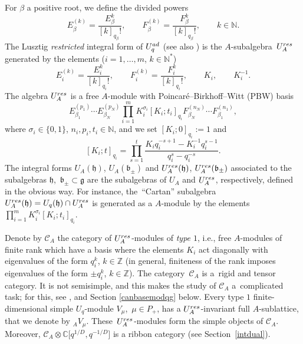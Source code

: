 \documentclass[11pt]{article}
\numberwithin{equation}{section}
\numberwithin{equation}{section}
\theoremstyle{definition}
\newcommand{\mc}{\mathbb{C}}
\newcommand{\mz}{\mathbb{Z}}
\newcommand{\mn}{\mathbb{N}}
\begin{document}
For $\beta$ a positive root, we define the divided powers
\[E_{\beta}^{(k)} = \frac{E_\beta^k}{[k]_{q_\beta}!} , \qquad F_{\beta}^{(k)} = \frac{F_\beta^k}{[k]_{q_\beta}!}, \qquad k\in \mn.\]
The Lusztig {\it restricted} integral form of $U_q^{\rm ad}$ \cite{Lusztig2,Lusztig} (see also \cite[Chapter 9.3]{CP}) is the $A$-sub\-algebra~$U_A^{\rm res}$ generated by the elements ($i=1,\dots,m$, $k\in \mn^*$)
\[E_i^{(k)}= \frac{E_i^k}{[k]_{q_i}!},\qquad F_i^{(k)}= \frac{F_i^k}{[k]_{q_i}!} ,\qquad K_i ,\qquad K_i^{-1}.\]
The algebra $U_A^{\rm res}$ is a free $A$-module with Poincar\'e--Birkhoff--Witt (PBW) basis
\[%
E_{\beta_1}^{(p_1)}\cdots E_{\beta_N}^{(p_N)}\prod_{i=1}^m K_i^{\sigma_i}[ K_i; t_i]_{q_i} F_{\beta_N}^{(n_N)}\cdots F_{\beta_1}^{(n_1)},
\]
where $\sigma_i\in \{0,1\}$, $n_i,p_i, t_i\in \mn$, and we set $[ K_i; 0]_{q_i}:=1$ and
\[[ K_i; t ]_{q_i}= \prod_{s=1}^t \frac{K_iq_i^{-s+1}-K_i^{-1}q_i^{s-1}}{q_i^s-q_i^{-s}}.\]
The integral forms $U_A(\mathfrak{h})$, $U_A(\mathfrak{b}_\pm)$ and $U_A^{\rm res}(\mathfrak{h})$, $U_A^{\rm res}(\mathfrak{b}_\pm)$ associated to the subalgebras $\mathfrak{h}$,~$\mathfrak{b}_\pm \subset \mathfrak{g}$ are the subalgebras of $U_A$ and $U_A^{\rm res}$, respectively, defined in the obvious way. For instance, the~``Cartan'' subalgebra $U_A^{\rm res}(\mathfrak{h}) = U_q(\mathfrak{h})\cap U_A^{\rm res}$ is generated as a $A$-module by the elements $\prod_{i=1}^m K_i^{\sigma_i}[ K_i; t_i]_{q_i}$.

Denote by $\mathcal{C}_A$ the category of $U_A^{\rm res}$-modules of {\it type $1$}, i.e., free $A$-modules of finite rank which have a basis where the elements $K_i$ act diagonally with eigenvalues of the form $q_i^k$, $k\in \mz$ (in general, finiteness of the rank imposes eigenvalues of the form $\pm q_i^k$, $k\in \mz$). The category~$\mathcal{C}_A$ is a~rigid and tensor category. It is not semisimple, and this makes the study of $\mathcal{C}_A$ a~complicated task; for this, see \cite{BR}, and Section \ref{canbasemodqg} below. Every type $1$ finite-dimensional simple $U_q$-module $V_\mu$,~$\mu \in P_+$, has a $U_A^{\rm res}$-invariant full $A$-sublattice, that we denote by ${}_AV_\mu$. These~$U_A^{\rm res}$-modules form the simple objects of $\mathcal{C}_A$. Moreover, $\mathcal{C}_A \otimes \mc\big[q^{1/D},q^{-1/D}\big]$ is a ribbon category (see Section~\ref{intdual}).
\end{document}
